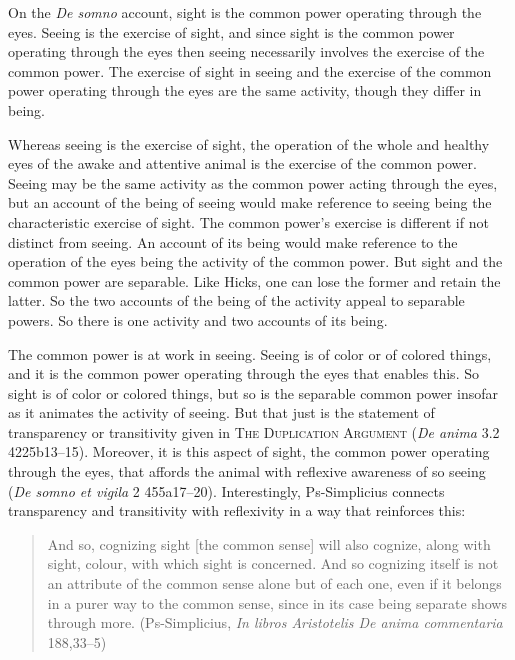 On the \emph{De somno} account, sight is the common power operating through the eyes. Seeing is the exercise of sight, and since sight is the common power operating through the eyes then seeing necessarily involves the exercise of the common power. The exercise of sight in seeing and the exercise of the common power operating through the eyes are the same activity, though they differ in being. 

Whereas seeing is the exercise of sight, the operation of the whole and healthy eyes of the awake and attentive animal is the exercise of the common power. Seeing may be the same activity as the common power acting through the eyes, but an account of the being of seeing would make reference to seeing being the characteristic exercise of sight. The common power's exercise is different if not distinct from seeing. An account of its being would make reference to the operation of the eyes being the activity of the common power. But sight and the common power are separable. Like Hicks, one can lose the former and retain the latter. So the two accounts of the being of the activity appeal to separable powers. So there is one activity and two accounts of its being.

The common power is at work in seeing. Seeing is of color or of colored things, and it is the common power operating through the eyes that enables this. So sight is of color or colored things, but so is the separable common power insofar as it animates the activity of seeing. But that just is the statement of transparency or transitivity given in \textsc{The Duplication Argument} (\emph{De anima} 3.2 4225b13–15). Moreover, it is this aspect of sight, the common power operating through the eyes, that affords the animal with reflexive awareness of so seeing (\emph{De somno et vigila} 2 455a17–20). Interestingly, Ps-Simplicius connects transparency and transitivity with reflexivity in a way that reinforces this:
\begin{quote}
	And so, cognizing sight [the common sense] will also cognize, along with sight, colour, with which sight is concerned. And so cognizing itself is not an attribute of the common sense alone but of each one, even if it belongs in a purer way to the common sense, since in its case being separate shows through more. (Ps-Simplicius, \emph{In libros Aristotelis De anima commentaria} 188,33–5)
\end{quote}

